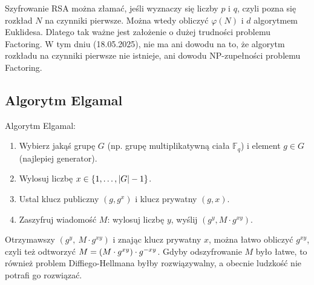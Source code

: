 Szyfrowanie RSA można złamać, jeśli wyznaczy się liczby \( p \) i \( q \), czyli pozna się rozkład \( N \) na czynniki pierwsze.
Można wtedy obliczyć \( \varphi(N) \) i \( d \) algorytmem Euklidesa. Dlatego tak ważne jest założenie o dużej trudności problemu Factoring.
W tym dniu (18.05.2025), nie ma ani dowodu na to, że algorytm rozkładu na czynniki pierwsze nie istnieje, ani dowodu NP-zupełności problemu Factoring.

\subsection{Algorytm Elgamal}
\begin{greyframe}
    Algorytm Elgamal:
    \begin{enumerate}
        \item Wybierz jakąś grupę \( G \) (np. grupę multiplikatywną ciała \( \mathbb{F}_q \)) i element \( g \in G \) \\ (najlepiej generator).
        \item Wylosuj liczbę \( x \in \set{1, \ldots, \abs{G}-1} \).
        \item Ustal klucz publiczny \( (g,g^x) \) i klucz prywatny \( (g,x) \).
        \item Zaszyfruj wiadomość \( M \): wylosuj liczbę \( y \), wyślij \( (g^y, M \cdot g^{xy}) \). 
    \end{enumerate}
\end{greyframe}
Otrzymawszy \( (g^y, \ M \cdot g^{xy}) \) i znając klucz prywatny \( x \), można łatwo obliczyć \( g^{xy} \), czyli też odtworzyć \( M = \left(M \cdot g^{xy}\right) \cdot g^{-xy} \).
Gdyby odszyfrowanie \( M \) było łatwe, to również problem Diffiego-Hellmana byłby rozwiązywalny, a obecnie ludzkość nie potrafi go rozwiązać.
